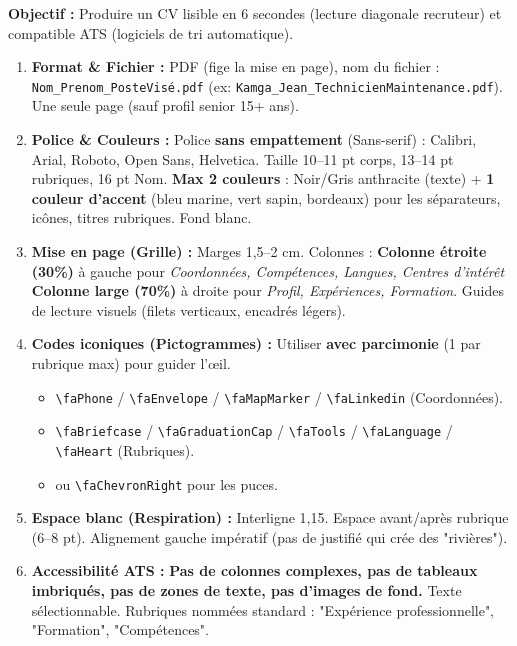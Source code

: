 \documentclass[11pt]{article}
\newcommand{\cle}[1]{{\popxbold\color{popdark}#1}}
\begin{document}
\begin{methode}
\textbf{Objectif :} Produire un CV lisible en 6 secondes (lecture diagonale recruteur) et compatible ATS (logiciels de tri automatique).
\begin{enumerate}
    \item \textbf{Format \& Fichier :} \cle{PDF} (fige la mise en page), nom du fichier : \texttt{Nom\_Prenom\_PosteVisé.pdf} (ex: \texttt{Kamga\_Jean\_TechnicienMaintenance.pdf}). Une seule page (sauf profil senior 15+ ans).
    \item \textbf{Police \& Couleurs :} Police \textbf{sans empattement} (Sans-serif) : Calibri, Arial, Roboto, Open Sans, Helvetica. Taille 10--11 pt corps, 13--14 pt rubriques, 16 pt Nom. \textbf{Max 2 couleurs} : Noir/Gris anthracite (texte) + \textbf{1 couleur d'accent} (bleu marine, vert sapin, bordeaux) pour les séparateurs, icônes, titres rubriques. Fond blanc.
    \item \textbf{Mise en page (Grille) :} Marges 1,5--2 cm. Colonnes : \textbf{Colonne étroite (30\%)} à gauche pour \emph{Coordonnées, Compétences, Langues, Centres d'intérêt} \textbf{Colonne large (70\%)} à droite pour \emph{Profil, Expériences, Formation}. Guides de lecture visuels (filets verticaux, encadrés légers).
    \item \textbf{Codes iconiques (Pictogrammes) :} Utiliser \textbf{avec parcimonie} (1 par rubrique max) pour guider l'œil.
    \begin{itemize}
        \item \texttt{\textbackslash{}faPhone} / \texttt{\textbackslash{}faEnvelope} / \texttt{\textbackslash{}faMapMarker} / \texttt{\textbackslash{}faLinkedin} (Coordonnées).
        \item \texttt{\textbackslash{}faBriefcase} / \texttt{\textbackslash{}faGraduationCap} / \texttt{\textbackslash{}faTools} / \texttt{\textbackslash{}faLanguage} / \texttt{\textbackslash{}faHeart} (Rubriques).
        \item \texttt{\textbullet} ou \texttt{\textbackslash{}faChevronRight} pour les puces.
    \end{itemize}
    \item \textbf{Espace blanc (Respiration) :} Interligne 1,15. Espace avant/après rubrique (6--8 pt). Alignement gauche impératif (pas de justifié qui crée des "rivières").
    \item \textbf{Accessibilité ATS :} \textbf{Pas de colonnes complexes, pas de tableaux imbriqués, pas de zones de texte, pas d'images de fond.} Texte sélectionnable. Rubriques nommées standard : "Expérience professionnelle", "Formation", "Compétences".
\end{enumerate}
\end{methode}
\end{document}
